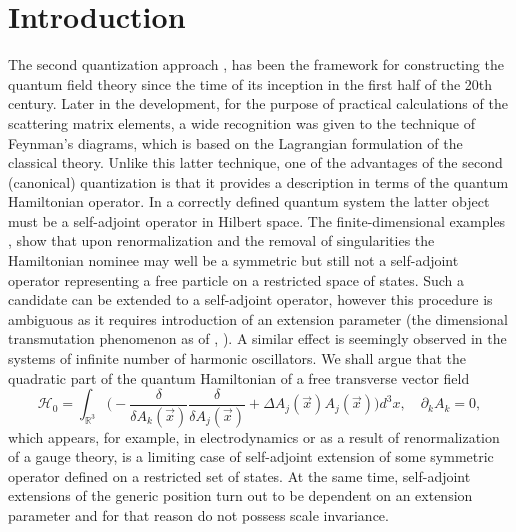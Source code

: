 \documentclass[12pt]{article}
\newcommand{\HH}{\mathscr{H}}
\newcommand{\RR}{\mathbb{R}}
\begin{document}
\section*{Introduction}
	The second quantization approach
\cite{Dirac}, \cite{Becchi}
	has been the framework for constructing the quantum field theory
	since the time of its inception in the first half of the 20th century.
	Later in the development, for the purpose of practical calculations
	of the scattering matrix elements, a wide recognition was given
	to the technique of Feynman's diagrams,
        which is based on the Lagrangian formulation of the classical theory.
	Unlike this latter technique, one of the advantages of the second
	(canonical) quantization is that it provides a description in terms
    of the quantum Hamiltonian operator.
	In a correctly defined quantum system the latter object must be
	a self-adjoint operator in Hilbert space.
	The finite-dimensional examples 
\cite{BF},
\cite{Jackiw}
	show that upon renormalization and the removal of singularities
	the Hamiltonian nominee may well be a symmetric but still not
	a self-adjoint operator representing
    a free particle on a restricted space of states.
	Such a candidate can be extended to a self-adjoint operator,
    however this procedure is ambiguous as it requires introduction
    of an extension parameter (the dimensional transmutation phenomenon as of
\cite{Jackiw},
\cite{LFres}).
    A similar effect is seemingly observed in the systems of infinite number
    of harmonic oscillators.
	We shall argue that the quadratic part of the quantum Hamiltonian of a free transverse vector field
\begin{equation*}
    \HH_{0} = \int_{\RR^{3}} \bigl(-\frac{\delta}{\delta A_{k}(\vec{x})}
	\frac{\delta}{\delta A_{j}(\vec{x})}
	+ \Delta A_{j}(\vec{x}) A_{j}(\vec{x}) \bigr)d^{3}x, 
    \quad \partial_{k} A_{k} = 0 ,
\end{equation*}
    which appears, for example, in electrodynamics or as a result of
    renormalization of a gauge theory, is a limiting case of self-adjoint
    extension of some symmetric operator defined on a restricted set
    of states.
    At the same time, self-adjoint extensions of the generic position
    turn out to be dependent on an extension parameter and for that
    reason do not possess scale invariance.
\end{document}
